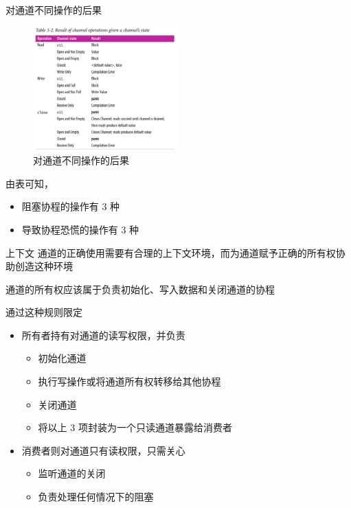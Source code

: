 \begin{frame}{对通道不同操作的后果}

\begin{figure}
    \includegraphics[width=0.5\textwidth]{images/channel-operations.png}
    \caption{对通道不同操作的后果}
\end{figure}

    由表可知，
\begin{itemize}
    \item 阻塞协程的操作有 3 种
    \item 导致协程恐慌的操作有 3 种
\end{itemize}
\end{frame}

\begin{frame}{上下文}
    通道的正确使用需要有合理的上下文环境，而为通道赋予正确的所有权协助创造这种环境

    \alert{通道的所有权应该属于负责初始化、写入数据和关闭通道的协程}
    
    通过这种规则限定
    \begin{itemize}
        \item \alert{所有者}持有对通道的\alert{读写权限}，并负责
            \begin{itemize}
                \item 初始化通道
                \item 执行写操作或将通道所有权转移给其他协程
                \item \alert{关闭通道}
                \item 将以上 3 项封装为一个只读通道暴露给消费者
            \end{itemize}
        \item \alert{消费者}则对通道只有\alert{读权限}，只需关心
            \begin{itemize}
                \item 监听通道的关闭
                \item 负责处理任何情况下的阻塞
            \end{itemize}
    \end{itemize} 
\end{frame}

